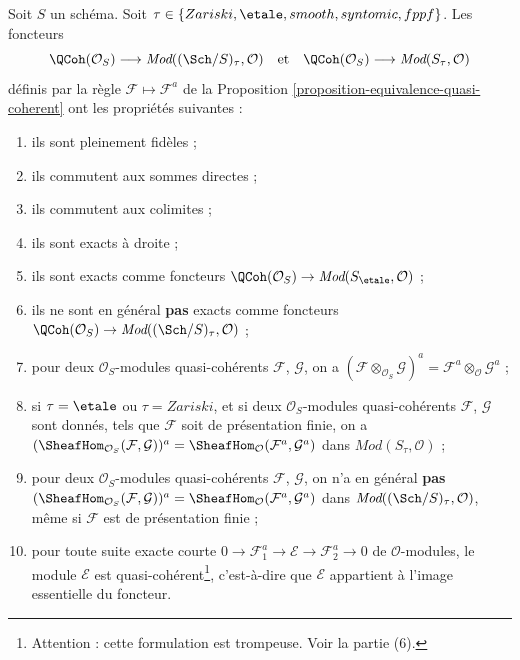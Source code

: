 \begin{lemma}
\label{lemma-equivalence-quasi-coherent-limits}
Soit $S$ un schéma.
Soit $\tau \in \{Zariski, \linebreak[0] \etale,
\linebreak[0] smooth, \linebreak[0] syntomic, \linebreak[0] fppf\}$.
Les foncteurs
$$
\QCoh(\mathcal{O}_S)
\longrightarrow
\textit{Mod}((\Sch/S)_\tau, \mathcal{O})
\quad\text{et}\quad
\QCoh(\mathcal{O}_S)
\longrightarrow
\textit{Mod}(S_\tau, \mathcal{O})
$$
définis par la règle $\mathcal{F} \mapsto \mathcal{F}^a$ de la
Proposition \ref{proposition-equivalence-quasi-coherent}
ont les propriétés suivantes :
\begin{enumerate}
\item ils sont pleinement fidèles ;
\item ils commutent aux sommes directes ;
\item ils commutent aux colimites ;
\item ils sont exacts à droite ;
\item ils sont exacts comme foncteurs
$\QCoh(\mathcal{O}_S) \to \textit{Mod}(S_\etale, \mathcal{O})$ ;
\item ils ne sont en général {\bf pas} exacts comme foncteurs
$\QCoh(\mathcal{O}_S) \to
\textit{Mod}((\Sch/S)_\tau, \mathcal{O})$ ;
\item pour deux $\mathcal{O}_S$-modules quasi-cohérents
$\mathcal{F}$, $\mathcal{G}$, on a
$(\mathcal{F} \otimes_{\mathcal{O}_S} \mathcal{G})^a =
\mathcal{F}^a \otimes_\mathcal{O} \mathcal{G}^a$ ;
\item si $\tau = \etale$ ou $\tau = Zariski$, et si deux
$\mathcal{O}_S$-modules quasi-cohérents $\mathcal{F}$, $\mathcal{G}$ sont
donnés, tels que $\mathcal{F}$ soit de présentation finie, on a
$(\SheafHom_{\mathcal{O}_S}(\mathcal{F}, \mathcal{G}))^a =
\SheafHom_\mathcal{O}(\mathcal{F}^a, \mathcal{G}^a)$ dans
$\textit{Mod}(S_\tau, \mathcal{O})$ ;
\item pour deux $\mathcal{O}_S$-modules quasi-cohérents
$\mathcal{F}$, $\mathcal{G}$, on n'a en général {\bf pas}
$(\SheafHom_{\mathcal{O}_S}(\mathcal{F}, \mathcal{G}))^a =
\SheafHom_\mathcal{O}(\mathcal{F}^a, \mathcal{G}^a)$
dans $\textit{Mod}((\Sch/S)_\tau, \mathcal{O})$, même si
$\mathcal{F}$ est de présentation finie ;
\item pour toute suite exacte courte
$0 \to \mathcal{F}_1^a \to \mathcal{E} \to \mathcal{F}_2^a \to 0$
de $\mathcal{O}$-modules, le module $\mathcal{E}$ est
quasi-cohérent\footnote{Attention : cette formulation est trompeuse. Voir la
partie (6).}, c'est-à-dire que $\mathcal{E}$ appartient à l'image essentielle
du foncteur.
\end{enumerate}
\end{lemma}

